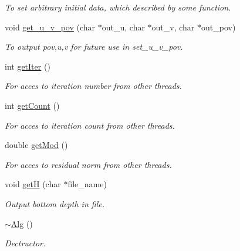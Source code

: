 \begin{DoxyCompactItemize}
\begin{DoxyCompactList}\small\item\em To set arbitrary initial data, which described by some function. \end{DoxyCompactList}\item 
\hypertarget{classAlg_a951b1131ee55c2ad043e438875f79c8b}{
void \hyperlink{classAlg_a951b1131ee55c2ad043e438875f79c8b}{get\_\-u\_\-v\_\-pov} (char $\ast$out\_\-u, char $\ast$out\_\-v, char $\ast$out\_\-pov)}
\label{classAlg_a951b1131ee55c2ad043e438875f79c8b}

\begin{DoxyCompactList}\small\item\em To output pov,u,v for future use in set\_\-u\_\-v\_\-pov. \end{DoxyCompactList}\item 
int \hyperlink{classAlg_ae2bdccac93c7a7e1b4ee22ee8b0634da}{getIter} ()
\begin{DoxyCompactList}\small\item\em For acces to iteration number from other threads. \end{DoxyCompactList}\item 
int \hyperlink{classAlg_aa377e54781d9fd7a3374dc64ede0d91d}{getCount} ()
\begin{DoxyCompactList}\small\item\em For acces to iteration count from other threads. \end{DoxyCompactList}\item 
double \hyperlink{classAlg_a5c2884279fc98cf7ea5f6e9893c86c61}{getMod} ()
\begin{DoxyCompactList}\small\item\em For acces to residual norm from other threads. \end{DoxyCompactList}\item 
void \hyperlink{classAlg_a48499068ba0c33ef77da2146f378cebf}{getH} (char $\ast$file\_\-name)
\begin{DoxyCompactList}\small\item\em Output bottom depth in file. \end{DoxyCompactList}\item 
\hypertarget{classAlg_ad1a45a2cb49f8d1a6d6cdaa37e8ce0ae}{
\hyperlink{classAlg_ad1a45a2cb49f8d1a6d6cdaa37e8ce0ae}{$\sim$Alg} ()}
\label{classAlg_ad1a45a2cb49f8d1a6d6cdaa37e8ce0ae}

\begin{DoxyCompactList}\small\item\em Dectructor. \end{DoxyCompactList}\end{DoxyCompactItemize}
